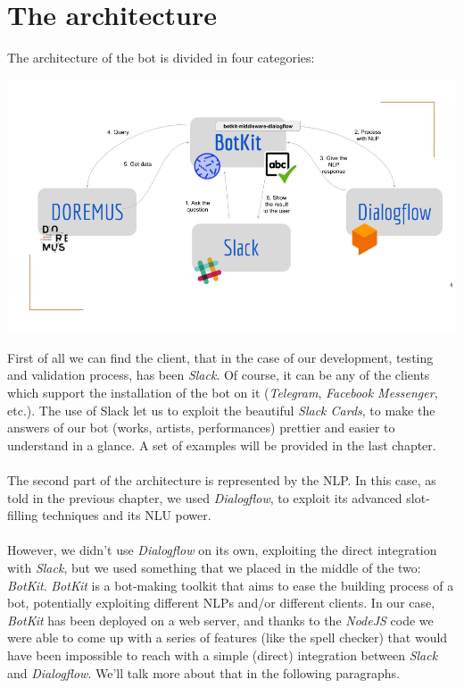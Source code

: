 \documentclass[a4paper,12pt]{report}
\begin{document}
	\section{The architecture}
	The architecture of the bot is divided in four categories:
	\begin{center}
		\includegraphics[scale=0.4]{architecture}
	\end{center}
	First of all we can find the client, that in the case of our development, testing and validation process, has been \textit{Slack}. Of course, it can be any of the clients which support the installation of the bot on it (\textit{Telegram}, \textit{Facebook Messenger}, etc.). The use of Slack let us to exploit the beautiful \textit{Slack Cards}, to make the answers of our bot (works, artists, performances) prettier and easier to understand in a glance. A set of examples will be provided in the last chapter.\\\\
	The second part of the architecture is represented by the NLP. In this case, as told in the previous chapter, we used \textit{Dialogflow}, to exploit its advanced slot-filling techniques and its NLU power.\\\\
	However, we didn't use \textit{Dialogflow} on its own, exploiting the direct integration with \textit{Slack}, but we used something that we placed in the middle of the two: \textit{BotKit}. \textit{BotKit} is a bot-making toolkit that aims to ease the building process of a bot, potentially exploiting different NLPs and/or different clients. In our case, \textit{BotKit} has been deployed on a web server, and thanks to the \textit{NodeJS} code we were able to come up with a series of features (like the spell checker) that would have been impossible to reach with a simple (direct) integration between \textit{Slack} and \textit{Dialogflow}. We'll talk more about that in the following paragraphs.\\\\
\end{document}
